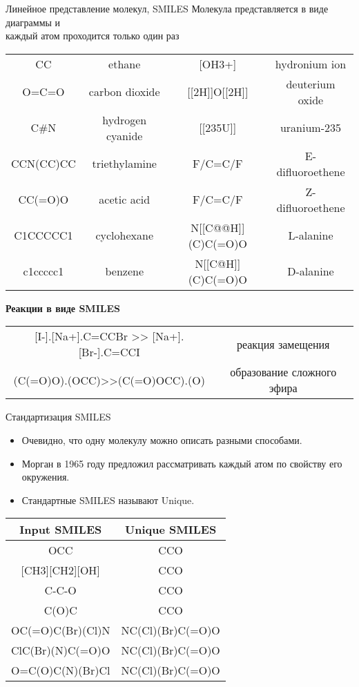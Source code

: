 \begin{frame}[fragile]{Линейное представление молекул, SMILES}
Молекула представляется в виде диаграммы и \\
каждый атом проходится только один раз 
\footnotesize
\begin{center}
\begin{tabular}{c c c c}%
		 \hline
		 CC & ethane & {[OH3+]} & hydronium ion \\
			 O=C=O & carbon dioxide & [[2H]]O[[2H]] & deuterium oxide \\
		 C{\#}N & hydrogen cyanide & [[235U]] & uranium-235 \\
CCN(CC)CC & triethylamine & F/C=C/F & E-difluoroethene \\
	 CC(=O)O & acetic acid & F/C=C\slash F & Z-difluoroethene \\
 C1CCCCC1 & cyclohexane & N[[C@@H]](C)C(=O)O & L-alanine \\
		c1ccccc1 & benzene & N[[C@H]](C)C(=O)O & D-alanine \\
	 \hline
\end{tabular}
\end{center}
	 \vspace{0.5cm}
\normalsize
\begin{center}
    \textbf{Реакции в виде SMILES}
\small

\begin{tabular}{c c}%
\hline
{[I-].[Na+]}.C=CCBr >> {[Na+].[Br-]}.C=CCI &  реакция замещения\\
{(C(=O)O).(OCC)>>(C(=O)OCC).(O)}    &     образование сложного эфира\\
\end{tabular}
\end{center}
\end{frame}


\begin{frame}{Стандартизация SMILES}
	\begin{itemize}
		\item  Очевидно, что одну молекулу можно описать разными способами.
		\item Морган в 1965 году предложил рассматривать каждый атом по свойству его окружения. 
		\item  Стандартные SMILES называют Unique.
	\end{itemize}
	\begin{center}
		\begin{tabular}{c c}
	\hline
	Input SMILES	&	Unique SMILES \\
	\hline
		OCC			&	CCO \\
     {[CH3][CH2][OH]}	&	CCO\\
	   C-C-O			&	CCO\\
	C(O)C			&	CCO\\
OC(=O)C(Br)(Cl)N &	NC(Cl)(Br)C(=O)O\\
ClC(Br)(N)C(=O)O &	NC(Cl)(Br)C(=O)O\\
O=C(O)C(N)(Br)Cl &	NC(Cl)(Br)C(=O)O\\
	\hline
\end{tabular}
	\end{center}
\end{frame}

